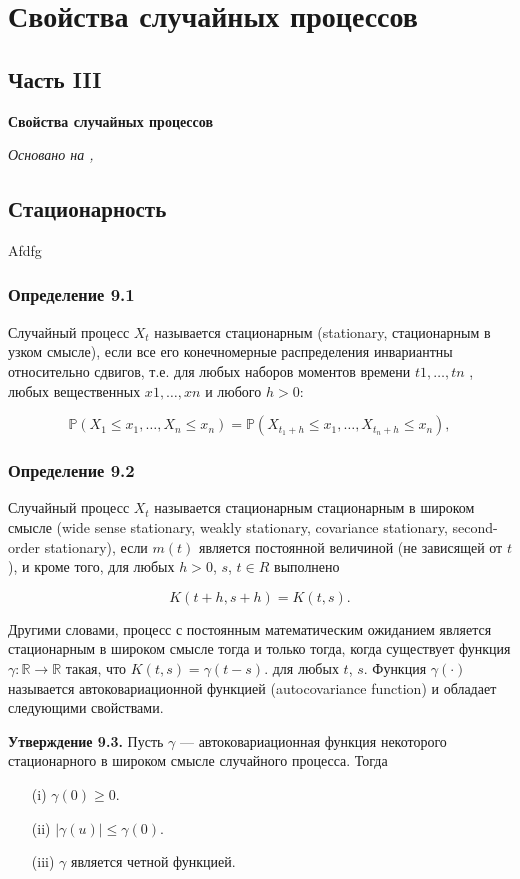\chapter{Свойства случайных процессов}
\section*{Часть III} \textbf{Свойства случайных процессов}

\textit{Основано на \cite{adeshereKorrelyaciyaMezhduVremennymi2021},\cite{panovTeoriyaSluchaynyhProcessov2018}}

\section{Стационарность} Afdfg
\subsection*{Определение 9.1} Случайный процесс \( X_t \) называется
стационарным (stationary, стационарным в узком смысле), если все его
конечномерные распределения инвариантны относительно сдвигов, т.е.
для любых наборов моментов времени $t1 , \dots, tn$ , любых вещественных
$x1 , \dots, xn$ и любого $h > 0$:

\[ \mathbb{P}(X_{1} \leq x_{1}, \ldots, X_{n} \leq x_{n}) =
\mathbb{P}(X_{t_1 + h} \leq x_{1}, \ldots, X_{t_n + h} \leq x_{n}), \]

\subsection*{Определение 9.2} Случайный процесс \( X_t \) называется
стационарным стационарным в широком смысле (wide sense stationary,
  weakly stationary, covariance stationary,
second-order stationary), если $m(t)$ является постоянной величиной
(не зависящей от $t$), и кроме того, для любых $h > 0$, $s$, $t \in R$ выполнено

\[ K(t + h, s + h) = K(t, s). \]

Другими словами, процесс с постоянным математическим ожиданием
является стационарным в широком смысле тогда и только тогда, когда
существует функция $ \gamma : \mathbb{R} \to \mathbb{R} $ такая, что $
K(t, s) = \gamma(t-s). $ для любых $t$, $s$. Функция $ \gamma
(\cdot) $ называется автоковариационной функцией
(autocovariance function)
и обладает следующими свойствами.

\textbf{Утверждение 9.3.} Пусть $\gamma$ — автоковариационная функция
некоторого стационарного в широком смысле случайного процесса. Тогда
\begin{itemize}
  \item[(i)] $\gamma(0) \geq 0$.
  \item[(ii)] $|\gamma(u)| \leq \gamma(0)$.
  \item[(iii)] $\gamma$ является четной функцией.
\end{itemize}

